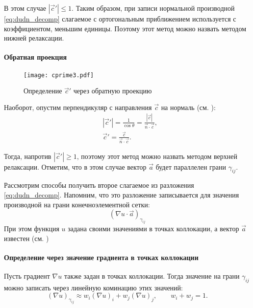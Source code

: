 В этом случае $|\vec c'| \leq 1$.
Таким образом, при записи нормальной производной \cref{eq:dudn_decomp} слагаемое с ортогональным приближением используется с коэффициентом, меньшим единицы.
Поэтому этот метод можно назвать методом нижней релаксации.

\paragraph{Обратная проекция}

\begin{figure}[h!]
\centering
\texttt{[image: cprime3.pdf]}
\caption{Определение $\vec c'$ через обратную проекцию}
\label{fig:cprime3}
\end{figure}

Наоборот, опустим перпендикуляр с направления $\vec c$ на нормаль (см. ):
\begin{align*}
&|\vec c'| = \frac{1}{\cos\theta} = \frac{|\vec c|}{\vec n \cdot \vec c}, \\
&\vec c' = \frac{\vec c}{\vec n \cdot \vec c}.
\end{align*}

Тогда, напротив $|\vec c'| \geq 1$, поэтому этот метод можно назвать методом верхней релаксации.
Отметим, что в этом случае вектор $\vec a$ будет параллелен грани $\gamma_{ij}$.

\label{sec:fvm_duda}
Рассмотрим способы получить второе слагаемое из разложения \cref{eq:dudn_decomp}.
Напомним, что это разложение записывается для значения производной на грани конечноэлементной сетки:
\begin{equation*}
\left(\nabla u \cdot \vec a\right)_{\gamma_{ij}}
\end{equation*}
При этом функция $u$ задана своими значениями в точках коллокации, а вектор $\vec a$ известен (см. )

\paragraph{Определение через значение градиента в точках коллокации}
Пусть градиент $\nabla u$ также задан в точках коллокации.
Тогда значение на грани $\gamma_{ij}$ 
можно записать через линейную коминацию этих значений:
\begin{equation*}
\left(\nabla u\right)_{\gamma_{ij}} \approx w_i \left(\nabla u\right)_i + w_j \left(\nabla u\right)_j, \qquad w_i + w_j = 1.
\end{equation*}

